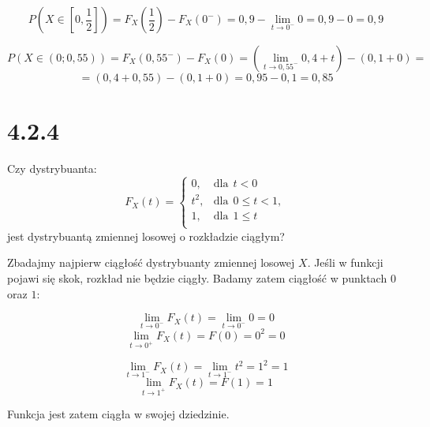 \documentclass{article}
\begin{document}
\begin{equation*}
    P(X \in [0, \frac{1}{2}]) = F_{X}(\frac{1}{2}) - F_{X}(0^{-}) = 0,9 - \lim_{t \to 0^{-}} 0 = 0,9 - 0 = 0,9
\end{equation*}

\begin{equation*}
    P(X \in (0; 0,55)) = F_{X}(0,55^{-}) - F_{X}(0) = (\lim_{t \to 0,55^{-}} 0,4 + t) - (0,1 + 0) = 
\end{equation*}
\begin{equation*}
    = (0,4 + 0,55) - (0,1 + 0) = 0,95 - 0,1 = 0,85
\end{equation*}

\section*{4.2.4}

\begin{center}
    Czy dystrybuanta:
    \begin{equation*}
        F_{X}(t) = 
            \begin{cases}
                0, & \text{dla} \ \  t < 0 \\
                t^2, & \text{dla} \ \   0 \leq t < 1,\\
                1, & \text{dla} \ \  1 \leq t\\
            \end{cases}
    \end{equation*}
    jest dystrybuantą zmiennej losowej o rozkładzie ciągłym?
\end{center}

Zbadajmy najpierw ciągłość dystrybuanty zmiennej losowej \(X\). Jeśli w funkcji pojawi się skok, rozkład nie będzie
ciągły. Badamy zatem ciągłość w punktach \(0\) oraz \(1\):

\begin{equation*}
    \lim_{t \to 0^{-}} F_{X}(t) = \lim_{t \to 0^{-}} 0 = 0
\end{equation*}
\begin{equation*}
    \lim_{t \to 0^{+}} F_{X}(t) = F(0) = 0^2 = 0 
\end{equation*}

\begin{equation*}
    \lim_{t \to 1^{-}} F_{X}(t) = \lim_{t \to 1^{-}} t^2 = 1^2 = 1
\end{equation*}
\begin{equation*}
    \lim_{t \to 1^{+}} F_{X}(t) = F(1) = 1
\end{equation*}

Funkcja jest zatem ciągła w swojej dziedzinie.
\end{document}
